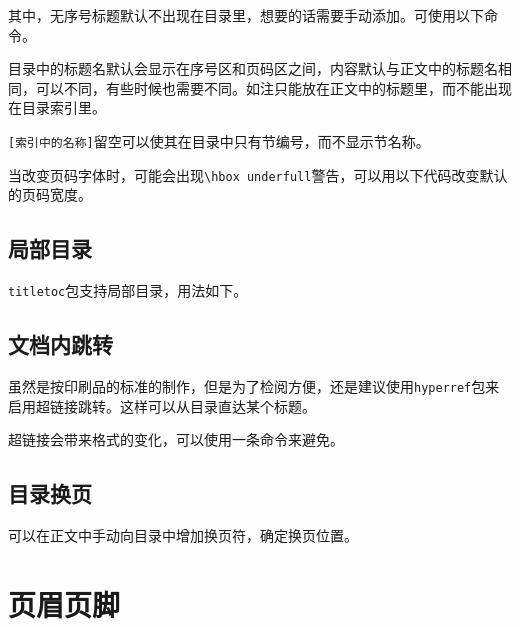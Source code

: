 \documentclass[10pt,openany]{book}
\begin{document}
\begin{sloppypar}
    

    其中，无序号标题默认不出现在目录里，想要的话需要手动添加。可使用以下命令。

    

    目录中的标题名默认会显示在序号区和页码区之间，内容默认与正文中的标题名相同，可以不同，有些时候也需要不同。如注只能放在正文中的标题里，而不能出现在目录索引里。

    

    \texttt{{[}索引中的名称{]}}留空可以使其在目录中只有节编号，而不显示节名称。

    当改变页码字体时，可能会出现\texttt{\textbackslash{}hbox\ underfull}警告，可以用以下代码改变默认的页码宽度。

    

    \section{局部目录}

    \texttt{titletoc}包支持局部目录，用法如下。

    

    \section{文档内跳转}

    虽然是按印刷品的标准的制作，但是为了检阅方便，还是建议使用\texttt{hyperref}包来启用超链接跳转。这样可以从目录直达某个标题。

    超链接会带来格式的变化，可以使用一条命令来避免。

    

    \section{目录换页}

    可以在正文中手动向目录中增加换页符，确定换页位置。

    

    \chapter{页眉页脚}
    \label{hf}


\end{sloppypar}
\end{document}
